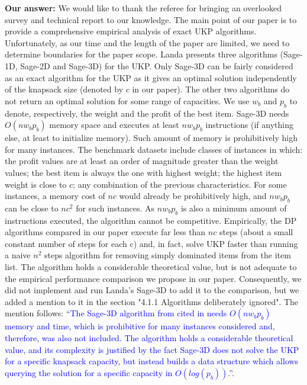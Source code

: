 \documentclass{elsarticle}
\begin{document}
\textbf{Our answer:}
We would like to thank the referee for bringing an overlooked survey and technical report to our knowledge.
The main point of our paper is to provide a comprehensive empirical analysis of exact UKP algorithms.
Unfortunately, as our time and the length of the paper are limited, we need to determine boundaries for the paper scope.
Landa presents three algorithms (Sage-1D, Sage-2D and Sage-3D) for the UKP.
Only Sage-3D can be fairly considered as an exact algorithm for the UKP as it gives an optimal solution independently of the knapsack size (denoted by \(c\) in our paper).
The other two algorithms do not return an optimal solution for some range of capacities.
We use \(w_b\) and \(p_b\) to denote, respectively, the weight and the profit of the best item.
Sage-3D needs \(O(n w_b p_b)\) memory space and executes at least \(n w_b p_b\) instructions (if anything else, at least to initialize memory).
Such amount of memory is prohibitively high for many instances.
The benchmark datasets include classes of instances in which: the profit values are at least an order of magnitude greater than the weight values; the best item is always the one with highest weight; the highest item weight is close to \(c\); any combination of the previous characteristics.
For some instances, a memory cost of \(nc\) would already be prohibitively high, and \(n w_b p_b\) can be close to \(n c^2\) for such instances.
As \(n w_b p_b\) is also a minimum amount of instructions executed, the algorithm cannot be competitive.
Empirically, the DP algorithms compared in our paper execute far less than \(nc\) steps (about a small constant number of steps for each c) and, in fact, solve UKP faster than running a naive \(n^2\) steps algorithm for removing simply dominated items from the item list.
The algorithm holds a considerable theoretical value, but is not adequate to the empirical performance comparison we propose in our paper.
Consequently, we did not implement and run Landa's Sage-3D to add it to the comparison, but we added a mention to it in the section "4.1.1 Algorithms deliberately ignored".
The mention follows: ``\textcolor{blue}{The Sage-3D algorithm from \cite{landa_sage} cited in \cite{ukp_hu_landa_shing_survey} needs \(O(n w_b p_b)\) memory and time, which is prohibitive for many instances considered and, therefore, was also not included.
The algorithm holds a considerable theoretical value, and its complexity is justified by the fact Sage-3D does not solve the UKP for a specific knapsack capacity, but instead builds a data structure which allows querying the solution for a specific capacity in \(O(log(p_b))\).}''.
\medskip
\end{document}
